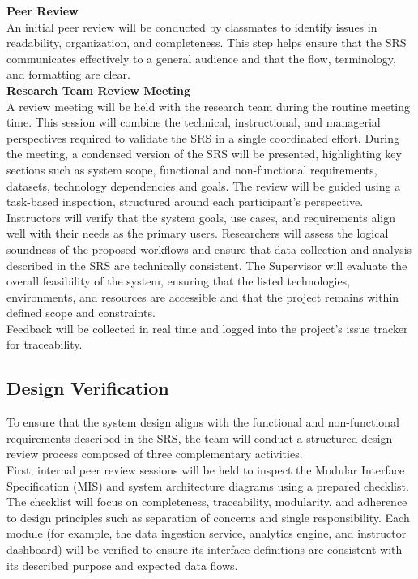 \documentclass[12pt, titlepage]{article}
\begin{document}
\textbf{Peer Review}\\

An initial peer review will be conducted by classmates to identify issues in readability, organization, and completeness. This step helps ensure that the SRS communicates effectively to a general audience and that the flow, terminology, and formatting are clear.\\

\textbf{Research Team Review Meeting}\\

A review meeting will be held with the research team during the routine meeting time. This session will combine the technical, instructional, and managerial perspectives required to validate the SRS in a single coordinated effort. During the meeting, a condensed version of the SRS will be presented, highlighting key sections such as system scope, functional and non-functional requirements, datasets, technology dependencies and goals. The review will be guided using a task-based inspection, structured around each participant’s perspective.\\

Instructors will verify that the system goals, use cases, and requirements align well with their needs as the primary users. Researchers will assess the logical soundness of the proposed workflows and ensure that data collection and analysis described in the SRS are technically consistent. The Supervisor will evaluate the overall feasibility of the system, ensuring that the listed technologies, environments, and resources are accessible and that the project remains within defined scope and constraints.\\

Feedback will be collected in real time and logged into the project’s issue tracker for traceability.\\


\subsection{Design Verification}

To ensure that the system design aligns with the functional and non-functional requirements described in the SRS, the team will conduct a structured design review process composed of three complementary activities.\\

First, internal peer review sessions will be held to inspect the Modular Interface Specification (MIS) and system architecture diagrams using a prepared checklist. The checklist will focus on completeness, traceability, modularity, and adherence to design principles such as separation of concerns and single responsibility. Each module (for example, the data ingestion service, analytics engine, and instructor dashboard) will be verified to ensure its interface definitions are consistent with its described purpose and expected data flows.\\
\end{document}
